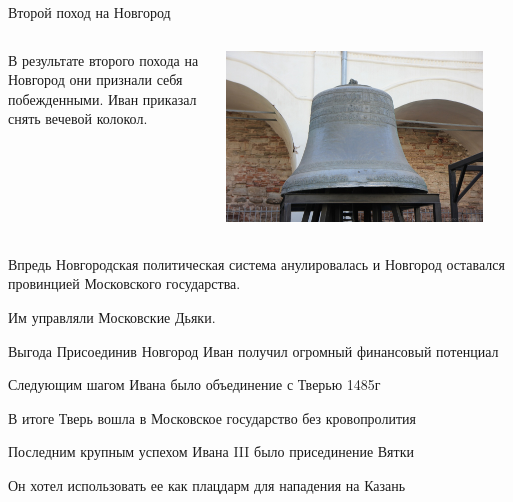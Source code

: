 \begin{frame}{Второй поход на Новгород}
	\begin{columns}
		\begin{column}{0.45\textwidth}

			В результате второго похода на Новгород они признали себя побежденными. Иван приказал снять вечевой колокол.

		\end{column}

		\begin{column}{0.45\textwidth}
			\includegraphics[width=0.9\textwidth]{images/ivan-2}
		\end{column}
	\end{columns}
\end{frame}

\begin{frame}{}

	Впредь Новгородская политическая система анулировалась и Новгород оставался провинцией Московского государства.

	Им управляли Московские Дьяки.
\end{frame}
\begin{frame}{Выгода}
	Присоединив Новгород Иван получил огромный финансовый потенциал
\end{frame}
\begin{frame}{}
	Следующим шагом Ивана было объединение с Тверью 1485г

	В итоге Тверь вошла в Московское государство без кровопролития
\end{frame}
\begin{frame}{}
	Последним крупным успехом Ивана III было присединение Вятки

	Он хотел использовать ее как плацдарм для нападения на Казань
\end{frame}
\begin{frame}{}
	\begin{columns}
		\begin{column}{0.45\textwidth}

		\end{column}

		\begin{column}{0.45\textwidth}

		\end{column}
	\end{columns}
\end{frame}

